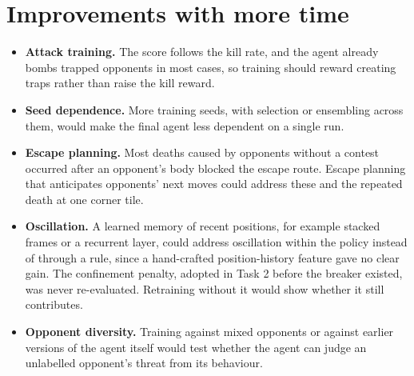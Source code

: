 \documentclass[11pt,a4paper]{report}
\begin{document}
	\section{Improvements with more time}
	\begin{itemize}[noitemsep]
		\item \textbf{Attack training.} The score follows the kill rate, and the agent already bombs trapped opponents in most cases, so training should reward creating traps rather than raise the kill reward.
		\item \textbf{Seed dependence.} More training seeds, with selection or ensembling across them, would make the final agent less dependent on a single run.
		\item \textbf{Escape planning.} Most deaths caused by opponents without a contest occurred after an opponent's body blocked the escape route. Escape planning that anticipates opponents' next moves could address these and the repeated death at one corner tile.
		\item \textbf{Oscillation.} A learned memory of recent positions, for example stacked frames or a recurrent layer, could address oscillation within the policy instead of through a rule, since a hand-crafted position-history feature gave no clear gain. The confinement penalty, adopted in Task 2 before the breaker existed, was never re-evaluated. Retraining without it would show whether it still contributes.
		\item \textbf{Opponent diversity.} Training against mixed opponents or against earlier versions of the agent itself would test whether the agent can judge an unlabelled opponent's threat from its behaviour.
	\end{itemize}
	
\end{document}

